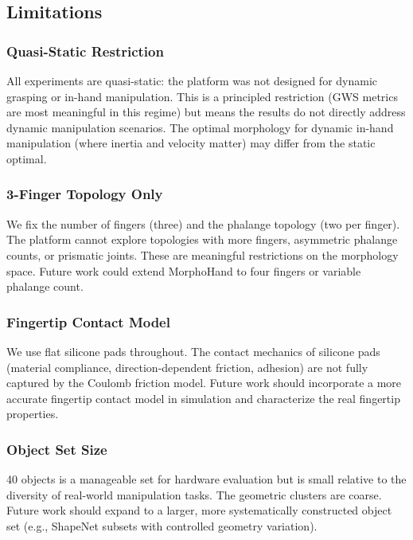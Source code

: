 \documentclass[journal]{IEEEtran}
\begin{document}
\subsection{Limitations}

\subsubsection{Quasi-Static Restriction}

All experiments are quasi-static: the platform was not designed for dynamic grasping
or in-hand manipulation.
This is a principled restriction (GWS metrics are most meaningful in this regime)
but means the results do not directly address dynamic manipulation scenarios.
The optimal morphology for dynamic in-hand manipulation (where inertia and velocity
matter) may differ from the static optimal.

\subsubsection{3-Finger Topology Only}

We fix the number of fingers (three) and the phalange topology (two per finger).
The platform cannot explore topologies with more fingers, asymmetric phalange counts,
or prismatic joints.
These are meaningful restrictions on the morphology space.
Future work could extend MorphoHand to four fingers or variable phalange count.

\subsubsection{Fingertip Contact Model}

We use flat silicone pads throughout.
The contact mechanics of silicone pads (material compliance, direction-dependent friction,
adhesion) are not fully captured by the Coulomb friction model.
Future work should incorporate a more accurate fingertip contact model in simulation
and characterize the real fingertip properties.

\subsubsection{Object Set Size}

40 objects is a manageable set for hardware evaluation but is small relative to the
diversity of real-world manipulation tasks.
The geometric clusters are coarse.
Future work should expand to a larger, more systematically constructed object set
(e.g., ShapeNet subsets with controlled geometry variation).
\end{document}

